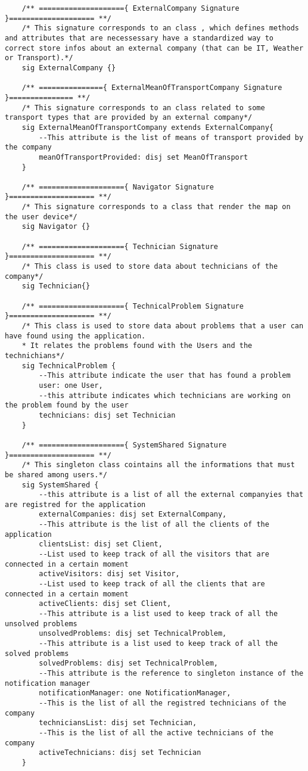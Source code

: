 \documentclass[a4paper,leqno]{book}
\begin{document}
\begin{lstlisting}
	/** ===================={ ExternalCompany Signature }==================== **/
	/* This signature corresponds to an class , which defines methods and attributes that are necessessary have a standardized way to correct store infos about an external company (that can be IT, Weather or Transport).*/
	sig ExternalCompany {}
	
	/** ==============={ ExternalMeanOfTransportCompany Signature }=============== **/
	/* This signature corresponds to an class related to some transport types that are provided by an external company*/
	sig ExternalMeanOfTransportCompany extends ExternalCompany{
		--This attribute is the list of means of transport provided by the company
		meanOfTransportProvided: disj set MeanOfTransport
	}
	
	/** ===================={ Navigator Signature }==================== **/
	/* This signature corresponds to a class that render the map on the user device*/
	sig Navigator {}
	
	/** ===================={ Technician Signature }==================== **/
	/* This class is used to store data about technicians of the company*/
	sig Technician{}
	
	/** ===================={ TechnicalProblem Signature }==================== **/
	/* This class is used to store data about problems that a user can have found using the application.
	* It relates the problems found with the Users and the technichians*/
	sig TechnicalProblem {
		--This attribute indicate the user that has found a problem
		user: one User,
		--this attribute indicates which technicians are working on the problem found by the user
		technicians: disj set Technician
	}
	
	/** ===================={ SystemShared Signature }==================== **/
	/* This singleton class cointains all the informations that must be shared among users.*/
	sig SystemShared {
		--this attribute is a list of all the external companyies that are registred for the application
		externalCompanies: disj set ExternalCompany,
		--This attribute is the list of all the clients of the application
		clientsList: disj set Client,
		--List used to keep track of all the visitors that are connected in a certain moment
		activeVisitors: disj set Visitor,
		--List used to keep track of all the clients that are connected in a certain moment
		activeClients: disj set Client,
		--This attribute is a list used to keep track of all the unsolved problems
		unsolvedProblems: disj set TechnicalProblem,
		--This attribute is a list used to keep track of all the solved problems
		solvedProblems: disj set TechnicalProblem,
		--This attribute is the reference to singleton instance of the notification manager
		notificationManager: one NotificationManager,
		--This is the list of all the registred technicians of the company
		techniciansList: disj set Technician,
		--This is the list of all the active technicians of the company
		activeTechnicians: disj set Technician
	}
	

\end{lstlisting}
\end{document}
